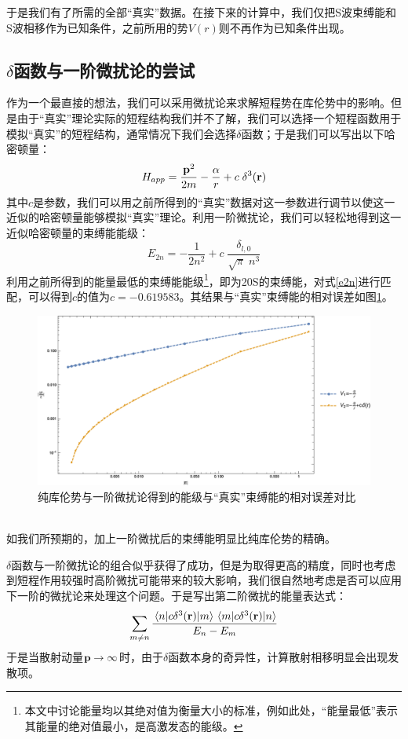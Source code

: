 \documentclass[cs4size,titlepage,twoside]{ctexart}
\begin{document}
于是我们有了所需的全部“真实”数据。在接下来的计算中，我们仅把S波束缚能和S波相移作为已知条件，之前所用的势$V(r)$则不再作为已知条件出现。
\subsection{$\delta$函数与一阶微扰论的尝试}
作为一个最直接的想法，我们可以采用微扰论来求解短程势在库伦势中的影响。但是由于“真实”理论实际的短程结构我们并不了解，我们可以选择一个短程函数用于模拟“真实”的短程结构，通常情况下我们会选择$\delta$函数；于是我们可以写出以下哈密顿量：
\begin{equation}
	H_{app}=\frac{\vb{p}^2}{2m}-\frac{\alpha}{r}+c\;\delta^3(\vb{r})
\end{equation}
其中$c$是参数，我们可以用之前所得到的“真实”数据对这一参数进行调节以使这一近似的哈密顿量能够模拟“真实”理论。利用一阶微扰论，我们可以轻松地得到这一近似哈密顿量的束缚能能级：
\begin{equation}\label{e2n}
	E_{2n}=-\frac{1}{2n^2}+c\;\frac{\delta_{l,0}}{\sqrt{\pi}\;n^3}
\end{equation}
利用之前所得到的能量最低的束缚能能级\footnote{本文中讨论能量均以其绝对值为衡量大小的标准，例如此处，“能量最低”表示其能量的绝对值最小，是高激发态的能级。}，即为20S的束缚能，对式\eqref{e2n}进行匹配，可以得到$c$的值为$c=-0.619583$。其结果与“真实”束缚能的相对误差如图\ref{LepageFigure1}。
\begin{figure}[!htbp]
	\centering
	\includegraphics[width=6.2in]{LepageFigure_1.eps}
	\caption{纯库伦势与一阶微扰论得到的能级与“真实”束缚能的相对误差对比}\label{LepageFigure1}
\end{figure}\\
如我们所预期的，加上一阶微扰后的束缚能明显比纯库伦势的精确。

$\delta$函数与一阶微扰论的组合似乎获得了成功，但是为取得更高的精度，同时也考虑到短程作用较强时高阶微扰可能带来的较大影响，我们很自然地考虑是否可以应用下一阶的微扰论来处理这个问题。于是写出第二阶微扰的能量表达式：
\begin{equation}\label{divergence}
	\sum_{m\neq n}\frac{\mel{n}{c\delta^3(\vb{r})}{m}\mel{m}{c\delta^3(\vb{r})}{n}}{E_n-E_m}
\end{equation}
于是当散射动量$\vb{p}\rightarrow\infty$时，由于$\delta$函数本身的奇异性，计算散射相移明显会出现发散项。
\end{document}
